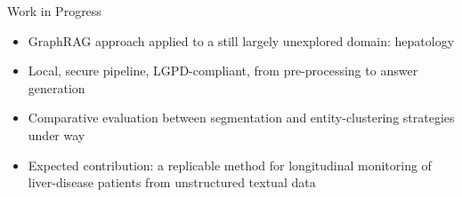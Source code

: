 \documentclass[9pt]{beamer}
\begin{document}
    \begin{frame}{Work in Progress}
        \begin{itemize}
            \item GraphRAG approach applied to a still largely unexplored domain: hepatology
            \item Local, secure pipeline, LGPD-compliant, from pre-processing to answer generation
            \item Comparative evaluation between segmentation and entity-clustering strategies under way
            \item Expected contribution: a replicable method for longitudinal monitoring of liver-disease patients from unstructured textual data
        \end{itemize}
    \end{frame}

    \bibliographpage

    \QApage
\end{document}

